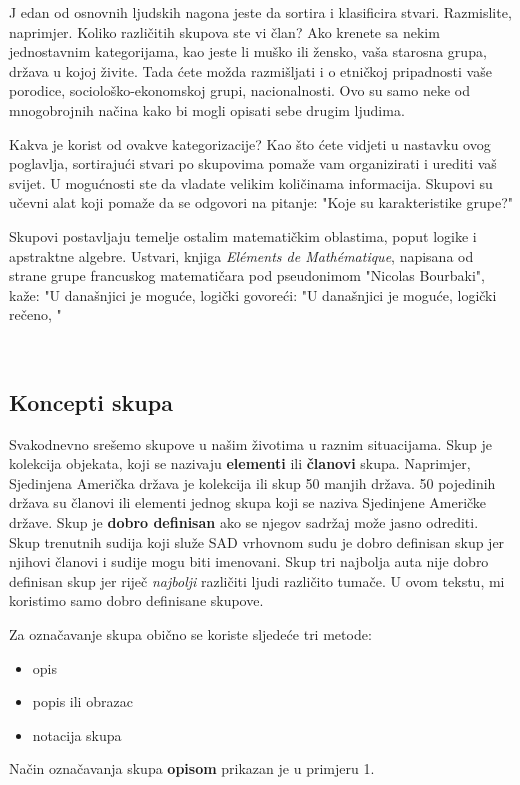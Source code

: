 \documentclass[a4paper,14pt,svgnames]{article}
\begin{document}
\bigskip\bigskip
\Large{\lettrine{J}{} edan od osnovnih ljudskih nagona jeste da sortira i klasificira stvari. Razmislite, naprimjer. Koliko različitih skupova ste vi član? Ako krenete sa nekim jednostavnim kategorijama, kao jeste li muško ili žensko, vaša starosna grupa, država u kojoj živite. Tada ćete možda razmišljati i o etničkoj pripadnosti vaše porodice, sociološko-ekonomskoj grupi, nacionalnosti. Ovo su samo neke od mnogobrojnih načina kako bi mogli opisati sebe drugim ljudima.\par
Kakva je korist od ovakve kategorizacije? Kao što ćete vidjeti u nastavku ovog poglavlja, sortirajući stvari po skupovima pomaže vam organizirati i urediti vaš svijet. U mogućnosti ste da vladate velikim količinama informacija. Skupovi su učevni alat koji pomaže da se odgovori na pitanje: "Koje su karakteristike grupe?"\par
Skupovi postavljaju temelje ostalim matematičkim oblastima, poput logike i apstraktne algebre. Ustvari, knjiga \textit{El\' ements de Math\' ematique}, napisana od strane grupe francuskog matematičara pod pseudonimom "Nicolas Bourbaki", kaže: "U današnjici je moguće, logički govoreći: "U današnjici je moguće, logički rečeno, "}\\[\baselineskip]

\normalsize \subsection{Koncepti skupa}
\bigskip\bigskip
Svakodnevno srešemo skupove u našim životima u raznim situacijama. Skup je kolekcija objekata, koji se nazivaju \textbf{elementi} ili \textbf{članovi} skupa. Naprimjer, Sjedinjena Američka država je kolekcija ili skup 50 manjih država. 50 pojedinih država su članovi ili elementi jednog skupa koji se naziva Sjedinjene Američke države.
Skup je \textbf{dobro definisan} ako se njegov sadržaj može jasno odrediti. Skup trenutnih sudija koji služe SAD vrhovnom sudu je dobro definisan skup jer njihovi članovi i sudije mogu biti imenovani. Skup tri najbolja auta nije dobro definisan skup jer riječ \textit{najbolji} različiti ljudi različito tumače. U ovom tekstu, mi koristimo samo dobro definisane skupove.\medskip

Za označavanje skupa obično se koriste sljedeće tri metode:
\begin{center}
\begin{itemize}
\item opis
\item popis ili obrazac
\item notacija skupa
\end{itemize}
\end{center}\medskip
Način označavanja skupa \textbf{opisom} prikazan je u primjeru 1.
\end{document}
